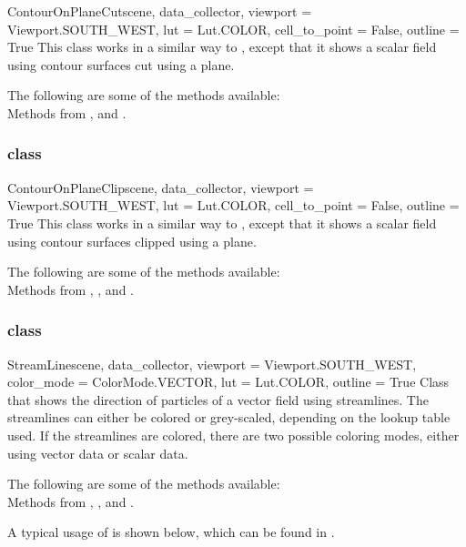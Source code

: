 \begin{classdesc}{ContourOnPlaneCut}{scene, data_collector,
viewport = Viewport.SOUTH_WEST, lut = Lut.COLOR, cell_to_point = False, 
outline = True}
This class works in a similar way to \MapOnPlaneCut, except that it shows a
scalar field using contour surfaces cut using a plane.
\end{classdesc}

The following are some of the methods available:\\
Methods from \ActorThreeD, \ContourModule and \Transform. 

\subsubsection{\ContourOnPlaneClip class}

\begin{classdesc}{ContourOnPlaneClip}{scene, data_collector, 
viewport = Viewport.SOUTH_WEST, lut = Lut.COLOR, cell_to_point = False, 
outline = True}
This class works in a similar way to \MapOnPlaneClip, except that it shows a 
scalar field using contour surfaces clipped using a plane.
\end{classdesc}

The following are some of the methods available:\\
Methods from \ActorThreeD, \ContourModule, \Transform and \Clipper. 

\subsubsection{\StreamLine class}

\begin{classdesc}{StreamLine}{scene, data_collector,
viewport = Viewport.SOUTH_WEST, color_mode = ColorMode.VECTOR, lut = Lut.COLOR,
outline = True}
Class that shows the direction of particles of a vector field using streamlines.
The streamlines can either be colored or grey-scaled, depending on the lookup
table used. If the streamlines are colored, there are two possible coloring 
modes, either using vector data or scalar data.
\end{classdesc}

The following are some of the methods available:\\
Methods from \ActorThreeD, \PointSource, \StreamLineModule and \Tube. 

A typical usage of \StreamLine is shown below, which can be found in 
\texttt{\PyvisiExampleDirectory}.

